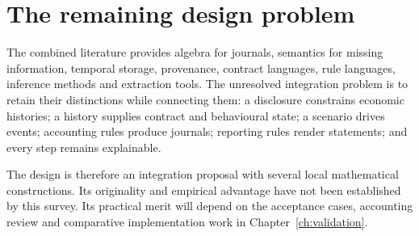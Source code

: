 \clearpage
\section{The remaining design problem}

The combined literature provides algebra for journals, semantics for missing
information, temporal storage, provenance, contract languages, rule languages,
inference methods and extraction tools. The unresolved integration problem is
to retain their distinctions while connecting them: a disclosure constrains
economic histories; a history supplies contract and behavioural state; a
scenario drives events; accounting rules produce journals; reporting rules
render statements; and every step remains explainable.

The design is therefore an integration proposal with several local
mathematical constructions. Its originality and empirical advantage have not
been established by this survey. Its practical merit will depend on the
acceptance cases, accounting review and comparative implementation work in
Chapter~\ref{ch:validation}.
